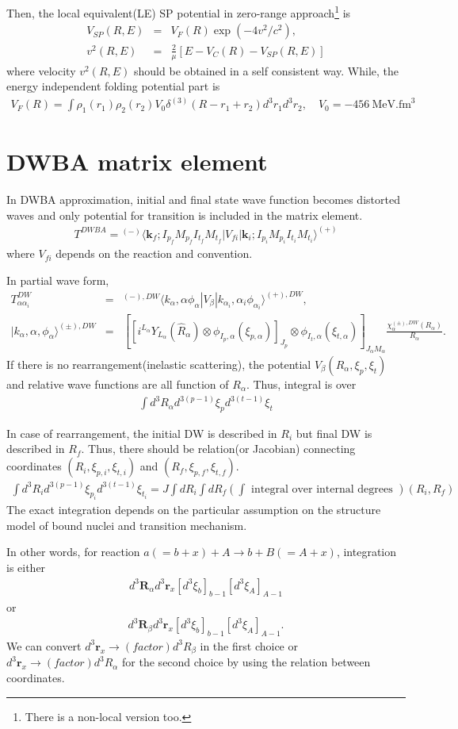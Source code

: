 \documentclass[11pt]{book}
\def\bm{\boldsymbol}
\def\vk{{\bm k}}
\def\vr{{\bm r}}
\def\vR{{\bm R}}
\def\la{\langle}
\def\ra{\rangle}
\newcommand{\bea}{\begin{eqnarray}}
\newcommand{\eea}{\end{eqnarray}}
\newcommand{\no}{\nonumber \\}
\begin{document}
Then, the local equivalent(LE) SP potential in zero-range approach\footnote{There is a non-local version too.}
 is  
\bea 
V_{SP}(R,E) &=& V_F(R) \exp(- 4 v^2/c^2), \no 
v^2(R,E) &=& \frac{2}{\mu}[E-V_C(R)-V_{SP}(R,E)]
\eea 
where velocity $v^2(R,E)$ should be obtained in a self consistent way. 
While, the energy independent folding potential part is 
\bea 
V_F(R) = \int \rho_1(r_1)\rho_2(r_2) V_0\delta^{(3)}(R-r_1+r_2) d^3 r_1 d^3 r_2, 
\quad V_0 = -456\ \mbox{MeV.fm}^3
\eea 

 
\section{DWBA matrix element}
In DWBA approximation, initial and final state wave function becomes 
distorted waves and only potential for transition is included in the matrix element. 
\bea 
T^{DWBA}={}^{(-)}\la \vk_f; I_{p_f} M_{p_f} I_{t_f} M_{t_f}|V_{fi}|\vk_i;I_{p_i} M_{p_i} I_{t_i} M_{t_i}\ra^{(+)} 
\eea 
where $V_{fi}$ depends on the reaction and convention. 

In partial wave form,
\bea 
T^{DW}_{\alpha\alpha_i}&=&
{}^{(-),DW}\la k_\alpha, \alpha \phi_\alpha | V_\beta | k_{\alpha_i}, \alpha_i \phi_{\alpha_i}\ra^{(+),DW},\no 
| k_{\alpha}, \alpha,\phi_\alpha\ra^{(\pm),DW}
&=&\left[ \left[i^{L_\alpha} Y_{L_\alpha}(\hat{R}_\alpha)
           \otimes \phi_{I_p,\alpha}(\xi_{p,\alpha})\right]_{J_p}
           \otimes \phi_{I_t,\alpha}(\xi_{t,\alpha})         
            \right]_{J_\alpha M_\alpha}  \frac{\chi_{\alpha}^{(\pm),DW}(R_{\alpha})}{R_{\alpha}}.
\eea 
If there is no rearrangement(inelastic scattering), 
the potential $V_\beta(R_\alpha,\xi_p,\xi_t)$ and relative wave functions are
all function of $R_\alpha$. Thus, integral is over 
\bea 
\int d^3 R_\alpha d^{3(p-1)}\xi_p d^{3(t-1)}\xi_t
\eea 

In case of rearrangement, the initial DW is described in $R_i$
but final DW is described in $R_f$. Thus, there should be relation(or Jacobian)
connecting coordinates $(R_i,\xi_{p,i},\xi_{t,i})$ 
and $(R_f,\xi_{p,f},\xi_{t,f})$.
\bea 
\int d^3 R_i d^{3(p-1)}\xi_{p_i} d^{3(t-1)}\xi_{t_i}
=J \int d R_i \int d R_f  
  (\int \mbox{ integral over internal degrees })(R_i,R_f)
\eea 
The exact integration depends on the particular assumption on the 
structure model of bound nuclei and transition mechanism. 

In other words, for reaction $a(=b+x)+A\to b+B(=A+x)$, integration is either
\bea 
d^3 \vR_\alpha d^3 \vr_x [d^3 \xi_b]_{b-1}[d^3\xi_A]_{A-1} 
\eea 
or 
\bea 
d^3 \vR_\beta d^3 \vr_x [d^3 \xi_b]_{b-1}[d^3\xi_A]_{A-1}. 
\eea 
We can convert $d^3\vr_x\to (factor) d^3 R_\beta$ in the first choice
or $d^3\vr_x\to (factor) d^3 R_{\alpha}$ for the second choice
by using the relation between coordinates. 
\end{document}
